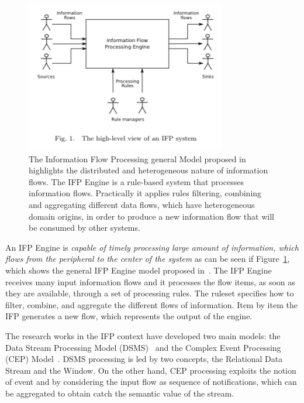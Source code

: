 \begin{figure}[tbh]
  \centering
	\includegraphics[width=0.75\linewidth]{images/ifp}
	\caption[IFP general Model]{The Information Flow Processing general Model proposed in~\cite{Cugola:2012:PFI:2187671.2187677} highlights the distributed and heterogeneous nature of information flows. The IFP Engine is a rule-based system that processes information flows. Practically it applies rules filtering, combining and aggregating different data flows, which have  heterogeneous domain origins, in order to produce a new information flow that will be consumed by other systems.}
  	\label{fig:ifp}
\end{figure}

An IFP Engine is \textit{capable of timely processing large amount of information, which flows from the peripheral to the center of the system} as can be seen if Figure~\ref{fig:ifp}, which shows the general IFP Engine model proposed in~\cite{Cugola:2012:PFI:2187671.2187677}. The IFP Engine receives many input information flows and it processes the flow items, as soon as they are available, through a set of processing rules. The ruleset specifies how to filter, combine, and aggregate the different flows of information. Item by item the IFP generates a new flow, which represents the output of the engine.

The research works in the IFP context have developed two main models: the Data Stream Processing Model (DSMS)~\cite{Babcock:2002:MID:543613.543615} and the Complex Event Processing (CEP) Model~\cite{Luckham:2001:PEI:515781}. 
DSMS processing is led by two concepts, the Relational Data Stream and the Window. On the other hand, CEP processing exploits the notion of event and by considering the input flow as sequence of notifications, which can be aggregated to obtain catch the semantic value of the stream.

